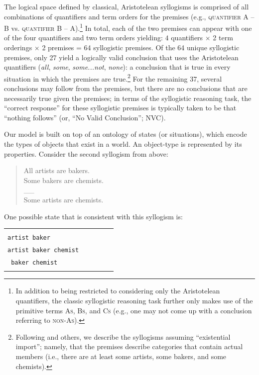 \documentclass[floatsintext, man]{apa6}
\begin{document}
The logical space defined by classical, Aristotelean syllogisms is comprised of all combinations of quantifiers and term orders for the premises (e.g., \textsc{quantifier} \textsc{A} -- \textsc{B} vs. \textsc{quantifier} \textsc{B} -- \textsc{A}).\footnote{In addition to being restricted to considering only the Aristotelean quantifiers, the classic syllogistic reasoning task further only makes use of the primitive terms \textsc{As}, \textsc{Bs}, and \textsc{Cs} (e.g., one may not come up with a conclusion referring to \textsc{non-As}).}
In total, each of the two premises can appear with one of the four quantifiers and two term orders yielding:  $4$ quantifiers  $\times$ 2 term orderings $\times$ 2 premises = 64 syllogistic premises.
Of the 64 unique syllogistic premises, only 27 yield a logically valid conclusion that uses the Aristotelean quantifiers (\emph{all}, \emph{some}, \emph{some...not}, \emph{none}): a conclusion that is true in every situation in which the premises are true.\footnote{Following  and others, we describe the syllogisms assuming ``existential import''; namely, that the premises describe categories that contain actual members (i.e., there are at least some artists, some bakers, and some chemists).}
For the remaining 37, several conclusions may follow from the premises, but there are no conclusions that are necessarily true given the premises; in terms of the syllogistic reasoning task, the ``correct response'' for these syllogistic premises is typically taken to be that ``nothing follows'' (or, ``No Valid Conclusion''; NVC). 



Our model is built on top of an ontology of states (or situations), which encode the types of objects that exist in a world. 
An object-type is represented by its properties.
Consider the second syllogism from above:

\begin{quote}
All artists are bakers. \\
Some bakers are chemists. \\
\_\_ \\
Some artists are chemists.
\end{quote}

One possible state that is consistent with this syllogism is:

\begin{tabularx}{.8\textwidth}{XXXXX}
& \\
\tt artist baker \\
\tt artist baker chemist \\
\tt \hspace{1.23cm} baker chemist 
& \\
& \\
\end{tabularx}
\end{document}
